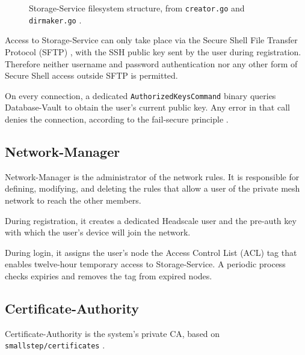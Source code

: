 \begin{figure}[H]
    \centering
    \begin{minipage}{0.85\linewidth}
    \end{minipage}
    \caption{Storage-Service filesystem structure, from \texttt{creator.go} and \texttt{dirmaker.go}
    \cite{ramusb-code-posixuser-owners,ramusb-code-posixuser-modes}.}
    \label{fig:filesystem-storage}
\end{figure}

Access to Storage-Service can only take place via the Secure Shell File Transfer Protocol (SFTP) \cite{sftp-filexfer},
with the SSH public key sent by the user during registration. Therefore neither
username and password authentication nor any other form of Secure Shell access outside SFTP is permitted.

On every connection, a dedicated \texttt{AuthorizedKeysCommand} binary queries Database-Vault to
obtain the user's current public key.
Any error in that call denies the connection, according to the fail-secure principle \cite{owasp-fail-securely}.

\subsection{Network-Manager}

Network-Manager is the administrator of the network rules. It is responsible for defining, modifying, and deleting the
rules that allow a user of the private mesh network to reach the other members.

During registration, it creates a dedicated Headscale user and the pre-auth key with which the user's
device will join the network.

During login, it assigns the user's node the Access Control List (ACL) tag that enables twelve-hour
temporary access to Storage-Service.
A periodic process checks expiries and removes the tag from expired nodes.

\subsection{Certificate-Authority}

Certificate-Authority is the system's private CA, based on \texttt{smallstep/certificates}
\cite{smallstep-certificates-github}.

